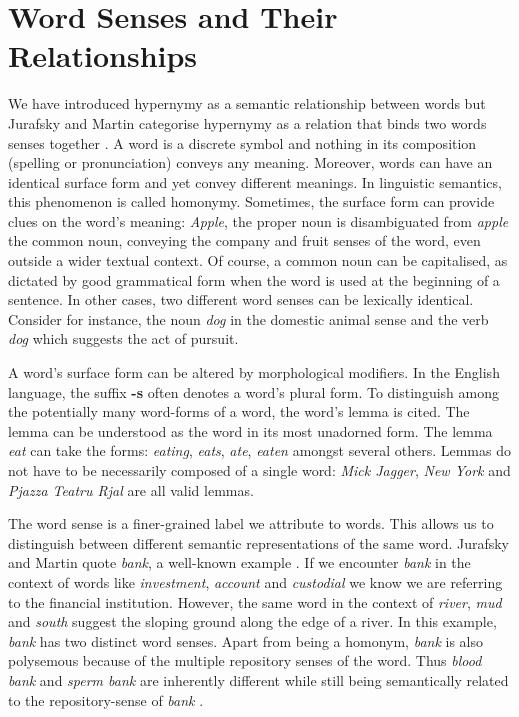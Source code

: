\section{Word Senses and Their Relationships}
We have introduced hypernymy as a semantic relationship between words but Jurafsky and Martin categorise hypernymy as a relation that binds two words senses together \citep{Jurafsky2009}.  A word is a discrete symbol and nothing in its composition (spelling or pronunciation) conveys any meaning.  Moreover, words can have an identical surface form and yet convey different meanings.  In linguistic semantics, this phenomenon is called homonymy.  Sometimes, the surface form can provide clues on the word’s meaning: \textit{Apple}, the proper noun is disambiguated from \textit{apple} the common noun, conveying the company and fruit senses of the word, even outside a wider textual context.  Of course, a common noun can be capitalised, as dictated by good grammatical form when the word is used at the beginning of a sentence.  In other cases, two different word senses can be lexically identical.  Consider for instance, the noun \textit{dog} in the domestic animal sense and the verb \textit{dog} which suggests the act of pursuit.  

A word’s surface form can be altered by morphological modifiers.  In the English language, the suffix \textbf{-s} often denotes a word’s plural form.  To distinguish among the potentially many word-forms of a word, the word’s lemma is cited.  The lemma can be understood as the word in its most unadorned form.  The lemma \textit{eat} can take the forms: \textit{eating}, \textit{eats}, \textit{ate}, \textit{eaten} amongst several others.  Lemmas do not have to be necessarily composed of a single word: \textit{Mick Jagger}, \textit{New York} and \textit{Pjazza Teatru Rjal} are all valid lemmas.

The word sense is a finer-grained label we attribute to words.  This allows us to distinguish between different semantic representations of the same word.  Jurafsky and Martin quote \textit{bank}, a well-known example \citep{Jurafsky2009}.  If we encounter \textit{bank} in the context of words like \textit{investment}, \textit{account} and \textit{custodial} we know we are referring to the financial institution.  However, the same word in the context of \textit{river}, \textit{mud} and \textit{south} suggest the sloping ground along the edge of a river.  In this example, \textit{bank} has two distinct word senses.  Apart from being a homonym, \textit{bank} is also polysemous because of the multiple repository senses of the word.  Thus \textit{blood bank} and \textit{sperm bank} are inherently different while still being semantically related to the repository-sense of \textit{bank} \citep{Jurafsky2009}.

